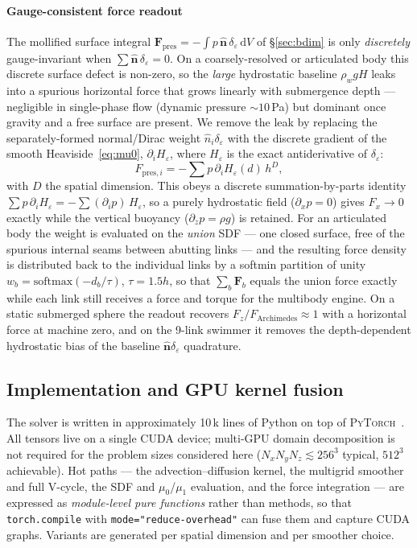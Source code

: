 \documentclass[journal,twoside,10pt]{IEEEtran}
\newcommand{\pytorch}{\textsc{PyTorch}\xspace}
\begin{document}
\paragraph{Gauge-consistent force readout}
The mollified surface integral
$\mathbf F_\mathrm{pres}=-\!\int p\,\hat{\mathbf n}\,
\delta_\varepsilon\,\mathrm dV$ of §\ref{sec:bdim} is only
\emph{discretely} gauge-invariant when
$\sum\hat{\mathbf n}\,\delta_\varepsilon=0$.  On a coarsely-resolved or
articulated body this discrete surface defect is non-zero, so the
\emph{large} hydrostatic baseline $\rho_w g H$ leaks into a spurious
horizontal force that grows linearly with submergence depth ---
negligible in single-phase flow (dynamic pressure $\sim\!10$\,Pa) but
dominant once gravity and a free surface are present.  We remove the
leak by replacing the separately-formed normal/Dirac weight
$\hat n_i\delta_\varepsilon$ with the discrete gradient of the smooth
Heaviside~\eqref{eq:mu0}, $\partial_i H_\varepsilon$, where
$H_\varepsilon$ is the exact antiderivative of $\delta_\varepsilon$:
\begin{equation}
  F_{\mathrm{pres},i}=-\!\sum p\,\partial_i H_\varepsilon(d)\,h^{D},
  \label{eq:dH}
\end{equation}
with $D$ the spatial dimension.  This obeys a discrete
summation-by-parts identity
$\sum p\,\partial_i H_\varepsilon=-\sum(\partial_i p)\,H_\varepsilon$,
so a purely hydrostatic field ($\partial_x p=0$) gives $F_x\!\to\!0$
exactly while the vertical buoyancy ($\partial_z p=\rho g$) is
retained.  For an articulated body the weight is evaluated on the
\emph{union} SDF --- one closed surface, free of the spurious internal
seams between abutting links --- and the resulting force density is
distributed back to the individual links by a softmin partition of
unity $w_b=\mathrm{softmax}(-d_b/\tau)$, $\tau{=}1.5h$, so that
$\sum_b\mathbf F_b$ equals the union force exactly while each link
still receives a force and torque for the multibody engine.  On a static submerged
sphere the readout recovers $F_z/F_\mathrm{Archimedes}\!\approx\!1$
with a horizontal force at machine zero, and on the 9-link swimmer it
removes the depth-dependent hydrostatic bias of the baseline
$\hat{\mathbf n}\delta_\varepsilon$ quadrature.


\subsection{Implementation and GPU kernel fusion}\label{sec:impl}

The solver is written in approximately 10\,k lines of Python on top
of \pytorch~\cite{paszke2019pytorch}.  All tensors live on a single
CUDA device; multi-GPU domain decomposition is not required for the
problem sizes considered here ($N_x N_y N_z\!\lesssim\!256^{3}$
typical, $512^3$ achievable).  Hot paths --- the advection--diffusion
kernel, the multigrid smoother and full V-cycle, the SDF and
$\mu_0$/$\mu_1$ evaluation, and the force integration --- are
expressed as \emph{module-level pure functions} rather than methods,
so that \texttt{torch.compile} with \texttt{mode="reduce-overhead"}
can fuse them and capture CUDA graphs.  Variants are generated per
spatial dimension and per smoother choice.
\end{document}
